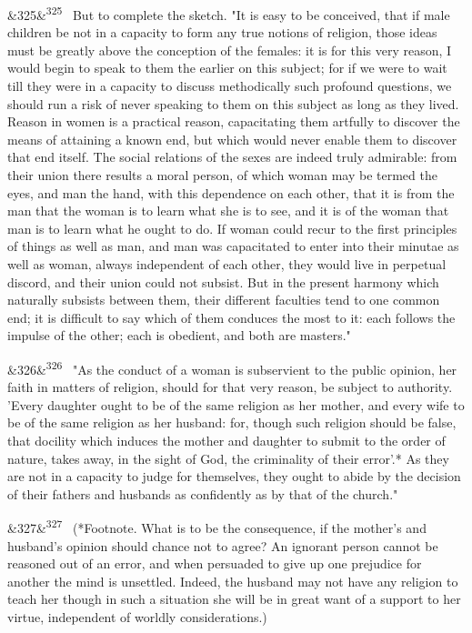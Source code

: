 \documentclass[12pt]{article}
\newcommand{\para}[1][]{\par\noindent\ifx&#1&\else\textsuperscript{\footnotesize #1}~\fi}
\begin{document}
\para[325] But to complete the sketch. "It is easy to be conceived, that if male children be not in a capacity to form any true notions of religion, those ideas must be greatly above the conception of the females: it is for this very reason, I would begin to speak to them the earlier on this subject; for if we were to wait till they were in a capacity to discuss methodically such profound questions, we should run a risk of never speaking to them on this subject as long as they lived. Reason in women is a practical reason, capacitating them artfully to discover the means of attaining a known end, but which would never enable them to discover that end itself. The social relations of the sexes are indeed truly admirable: from their union there results a moral person, of which woman may be termed the eyes, and man the hand, with this dependence on each other, that it is from the man that the woman is to learn what she is to see, and it is of the woman that man is to learn what he ought to do. If woman could recur to the first principles of things as well as man, and man was capacitated to enter into their minutae as well as woman, always independent of each other, they would live in perpetual discord, and their union could not subsist. But in the present harmony which naturally subsists between them, their different faculties tend to one common end; it is difficult to say which of them conduces the most to it: each follows the impulse of the other; each is obedient, and both are masters."

\para[326] "As the conduct of a woman is subservient to the public opinion, her faith in matters of religion, should for that very reason, be subject to authority. 'Every daughter ought to be of the same religion as her mother, and every wife to be of the same religion as her husband: for, though such religion should be false, that docility which induces the mother and daughter to submit to the order of nature, takes away, in the sight of God, the criminality of their error'.* As they are not in a capacity to judge for themselves, they ought to abide by the decision of their fathers and husbands as confidently as by that of the church."

\para[327] (*Footnote. What is to be the consequence, if the mother's and husband's opinion should chance not to agree? An ignorant person cannot be reasoned out of an error, and when persuaded to give up one prejudice for another the mind is unsettled. Indeed, the husband may not have any religion to teach her though in such a situation she will be in great want of a support to her virtue, independent of worldly considerations.)
\end{document}
